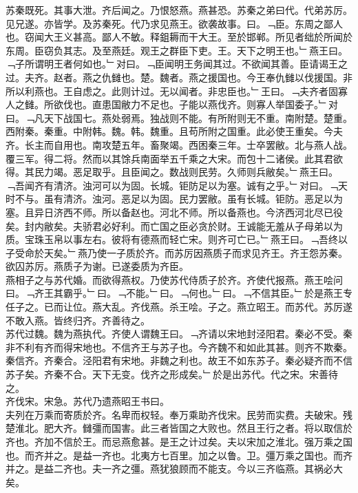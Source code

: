 \documentclass{zhvt-classic}
\begin{document}
\hspace*{2em}苏秦既死。其事大泄。齐后闻之。乃恨怒燕。燕甚恐。苏秦之弟曰代。代弟苏厉。见兄遂。亦皆学。及苏秦死。代乃求见燕王。欲袭故事。曰。﹁臣。东周之鄙人也。窃闻大王义甚高。鄙人不敏。释鉏耨而干大王。至於邯郸。所见者绌於所闻於东周。臣窃负其志。及至燕廷。观王之群臣下吏。王。天下之明王也。﹂燕王曰。﹁子所谓明王者何如也。﹂对曰。﹁臣闻明王务闻其过。不欲闻其善。臣请谒王之过。夫齐。赵者。燕之仇雠也。楚。魏者。燕之援国也。今王奉仇雠以伐援国。非所以利燕也。王自虑之。此则计过。无以闻者。非忠臣也。﹂王曰。﹁夫齐者固寡人之雠。所欲伐也。直患国敝力不足也。子能以燕伐齐。则寡人举国委子。﹂对曰。﹁凡天下战国七。燕处弱焉。独战则不能。有所附则无不重。南附楚。楚重。西附秦。秦重。中附韩。魏。韩。魏重。且苟所附之国重。此必使王重矣。今夫齐。长主而自用也。南攻楚五年。畜聚竭。西困秦三年。士卒罢敝。北与燕人战。覆三军。得二将。然而以其馀兵南面举五千乘之大宋。而包十二诸侯。此其君欲得。其民力竭。恶足取乎。且臣闻之。数战则民劳。久师则兵敝矣。﹂燕王曰。﹁吾闻齐有清济。浊河可以为固。长城。钜防足以为塞。诚有之乎。﹂对曰。﹁天时不与。虽有清济。浊河。恶足以为固。民力罢敝。虽有长城。钜防。恶足以为塞。且异日济西不师。所以备赵也。河北不师。所以备燕也。今济西河北尽已役矣。封内敝矣。夫骄君必好利。而亡国之臣必贪於财。王诚能无羞从子母弟以为质。宝珠玉帛以事左右。彼将有德燕而轻亡宋。则齐可亡已。﹂燕王曰。﹁吾终以子受命於天矣。﹂燕乃使一子质於齐。而苏厉因燕质子而求见齐王。齐王怨苏秦。欲囚苏厉。燕质子为谢。已遂委质为齐臣。\\
\hspace*{2em}燕相子之与苏代婚。而欲得燕权。乃使苏代侍质子於齐。齐使代报燕。燕王哙问曰。﹁齐王其霸乎。﹂曰。﹁不能。﹂曰。﹁何也。﹂曰。﹁不信其臣。﹂於是燕王专任子之。已而让位。燕大乱。齐伐燕。杀王哙。子之。燕立昭王。而苏代。苏厉遂不敢入燕。皆终归齐。齐善待之。\\
\hspace*{2em}苏代过魏。魏为燕执代。齐使人谓魏王曰。﹁齐请以宋地封泾阳君。秦必不受。秦非不利有齐而得宋地也。不信齐王与苏子也。今齐魏不和如此其甚。则齐不欺秦。秦信齐。齐秦合。泾阳君有宋地。非魏之利也。故王不如东苏子。秦必疑齐而不信苏子矣。齐秦不合。天下无变。伐齐之形成矣。﹂於是出苏代。代之宋。宋善待之。\\
\hspace*{2em}齐伐宋。宋急。苏代乃遗燕昭王书曰。\\
\hspace*{2em}夫列在万乘而寄质於齐。名卑而权轻。奉万乘助齐伐宋。民劳而实费。夫破宋。残楚淮北。肥大齐。雠彊而国害。此三者皆国之大败也。然且王行之者。将以取信於齐也。齐加不信於王。而忌燕愈甚。是王之计过矣。夫以宋加之淮北。强万乘之国也。而齐并之。是益一齐也。北夷方七百里。加之以鲁。卫。彊万乘之国也。而齐并之。是益二齐也。夫一齐之彊。燕犹狼顾而不能支。今以三齐临燕。其祸必大矣。\\
\end{document}
